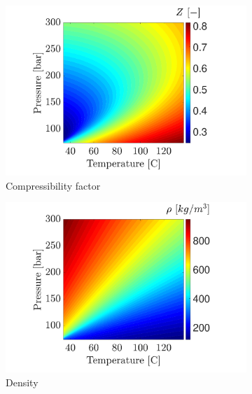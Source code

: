 \documentclass[../Article_Sensitivity_Analsysis.tex]{subfiles}
\begin{document}
	\begin{figure}[H]
		\begin{subfigure}[b]{0.32\textwidth}
			\centering
			\includegraphics[trim = 3.5cm 0cm 1.5cm 0cm,clip,width=\textwidth]{Figures/Compressibility.pdf}	
			\caption{Compressibility factor}
			\label{fig: SFE_Properties_Compressibility}
		\end{subfigure}
		\hfill
		\begin{subfigure}[b]{0.32\textwidth}
			\centering
			\includegraphics[trim = 3.5cm 0cm 1.5cm 0cm,clip,width=\textwidth]{Figures/RHO.pdf}	
			\caption{Density}
			\label{fig: SFE_Properties_Density}
		\end{subfigure}
		\hfill
		\begin{subfigure}[b]{0.32\textwidth}
			\centering

\end{subfigure}
\end{figure}
\end{document}
